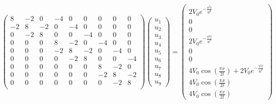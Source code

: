 \documentclass[11pt]{article}
\numberwithin{equation}{section}
\begin{document}
\begin{gather}
    \begin{pmatrix}
        8 & -2 & 0 & -4 & 0 & 0 & 0 & 0 & 0\\ 
        -2 & 8 & -2 & 0 & -4 & 0 & 0 & 0 & 0\\ 
        0 & -2 & 8 & 0 & 0 & -4 & 0 & 0 & 0\\ 
        0 & 0 & 0 & 8 & -2 & 0 & -4 & 0 & 0\\ 
        0 & 0 & 0 & -2 & 8 & -2 & 0 & -4 & 0\\ 
        0 & 0 & 0 & 0 & -2 & 8 & 0 & 0 & -4\\ 
        0 & 0 & 0 & 0 & 0 & 0 & 8 & -2 & 0\\ 
        0 & 0 & 0 & 0 & 0 & 0 & -2 & 8 & -2\\
        0 & 0 & 0 & 0 & 0 & 0 & 0 & -2 & 8\\ 
    \end{pmatrix}  \begin{pmatrix}
        u_1 \\
        u_2 \\
        u_3 \\
        u_4 \\
        u_5 \\
        u_6 \\
        u_7 \\
        u_8 \\
        u_9
    \end{pmatrix} = \begin{pmatrix}
        2V_0e^{-\frac{\pi^2 t }{4l^2}}\\
        0\\
        0\\
        2V_0e^{-\frac{\pi^2 t }{4l^2}}\\
        0\\
        0\\
        4V_0 \cos \left(\frac{\pi x}{2l}\right) + 2V_0e^{-\frac{\pi^2 t }{4l^2}}\\
        4V_0 \cos \left(\frac{\pi x}{2l}\right) \\
        4V_0 \cos \left(\frac{\pi x}{2l}\right) 
    \end{pmatrix}
\end{gather}
\end{document}
